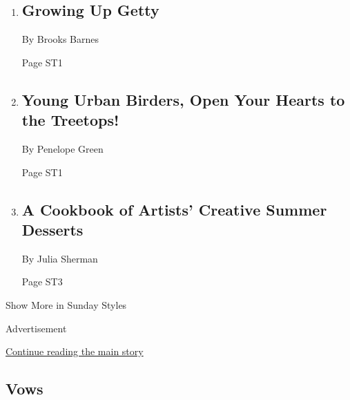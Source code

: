 \begin{enumerate}
\def\labelenumi{\arabic{enumi}.}
\item
  \href{/2018/06/23/style/getty-family.html}{}

  \hypertarget{growing-up-getty}{%
  \subsection{Growing Up Getty}\label{growing-up-getty}}

  By Brooks Barnes

  Page ST1
\item
  \href{/2018/06/23/style/birds-are-cool.html}{}

  \hypertarget{young-urban-birders-open-your-hearts-to-the-treetops-1}{%
  \subsection{Young Urban Birders, Open Your Hearts to the
  Treetops!}\label{young-urban-birders-open-your-hearts-to-the-treetops-1}}

  By Penelope Green

  Page ST1
\item
  \href{/2018/06/22/t-magazine/artists-dessert-recipes.html}{}

  \hypertarget{a-cookbook-of-artists-creative-summer-desserts}{%
  \subsection{A Cookbook of Artists' Creative Summer
  Desserts}\label{a-cookbook-of-artists-creative-summer-desserts}}

  By Julia Sherman

  Page ST3
\end{enumerate}

Show More in Sunday Styles

Advertisement

\protect\hyperlink{after-mid7}{Continue reading the main story}

\hypertarget{vows}{%
\subsection{Vows}\label{vows}}

